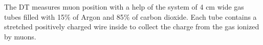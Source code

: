 The DT measures muon position with a help of the system of 4 cm wide gas tubes filled with 15$\%$ of Argon and 85$\%$ of carbon dioxide.
Each tube contains a stretched positively charged wire inside to collect the charge from the gas ionized by muons.

% 
